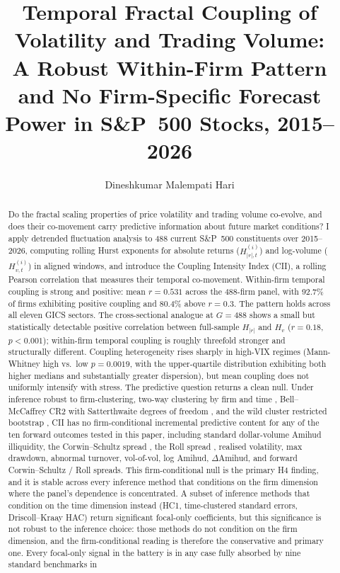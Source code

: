 \documentclass[preprint,12pt,authoryear]{elsarticle}
\begin{document}
\begin{frontmatter}

\title{Temporal Fractal Coupling of Volatility and Trading Volume:\\A Robust Within-Firm Pattern and No Firm-Specific Forecast Power in S\&P~500 Stocks, 2015--2026}

\author{Dineshkumar Malempati Hari}

\begin{abstract}
Do the fractal scaling properties of price volatility and trading volume co-evolve, and does their co-movement carry predictive information about future market conditions? I apply detrended fluctuation analysis to 488 current S\&P~500 constituents over 2015--2026, computing rolling Hurst exponents for absolute returns ($H^{(i)}_{|r|,t}$) and log-volume ($H^{(i)}_{v,t}$) in aligned windows, and introduce the Coupling Intensity Index (CII), a rolling Pearson correlation that measures their temporal co-movement. Within-firm temporal coupling is strong and positive: mean $r = 0.531$ across the 488-firm panel, with 92.7\% of firms exhibiting positive coupling and 80.4\% above $r = 0.3$. The pattern holds across all eleven GICS sectors. The cross-sectional analogue at $G = 488$ shows a small but statistically detectable positive correlation between full-sample $H_{|r|}$ and $H_v$ ($r = 0.18$, $p < 0.001$); within-firm temporal coupling is roughly threefold stronger and structurally different. Coupling heterogeneity rises sharply in high-VIX regimes (Mann-Whitney high vs.\ low $p = 0.0019$, with the upper-quartile distribution exhibiting both higher medians and substantially greater dispersion), but mean coupling does not uniformly intensify with stress. The predictive question returns a clean null. Under inference robust to firm-clustering, two-way clustering by firm and time \citep{cameron2011robust}, Bell--McCaffrey CR2 with Satterthwaite degrees of freedom \citep{imbens2016robust}, and the wild cluster restricted bootstrap \citep{mackinnon2017wild}, CII has no firm-conditional incremental predictive content for any of the ten forward outcomes tested in this paper, including standard dollar-volume Amihud \citep{amihud2002illiquidity} illiquidity, the Corwin--Schultz spread \citep{corwin2012simple}, the Roll spread \citep{roll1984spread}, realised volatility, max drawdown, abnormal turnover, vol-of-vol, log Amihud, $\Delta$Amihud, and forward Corwin--Schultz / Roll spreads. This firm-conditional null is the primary H4 finding, and it is stable across every inference method that conditions on the firm dimension where the panel's dependence is concentrated. A subset of inference methods that condition on the time dimension instead (HC1, time-clustered standard errors, Driscoll--Kraay HAC) return significant focal-only coefficients, but this significance is not robust to the inference choice: those methods do not condition on the firm dimension, and the firm-conditional reading is therefore the conservative and primary one. Every focal-only signal in the battery is in any case fully absorbed by nine standard benchmarks in 
\end{abstract}
\end{frontmatter}
\end{document}
